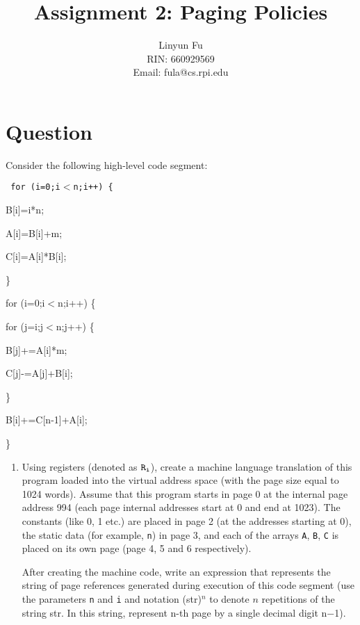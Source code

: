 \documentclass[12pt,letterpaper]{article}
\author{Linyun Fu\\RIN: 660929569\\Email: fula@cs.rpi.edu}
\title{Assignment 2: Paging Policies}
\begin{document}
\maketitle
\part*{Question}
Consider the following high-level code segment:

\vspace{1ex}

{\tt
\hspace{4em}for (i=0;i$<$n;i++) \{

\hspace{8em}B[i]=i*n;

\hspace{8em}A[i]=B[i]+m;

\hspace{8em}C[i]=A[i]*B[i];

\hspace{4em}\}

\hspace{4em}for (i=0;i$<$n;i++) \{

\hspace{8em}for (j=i;j$<$n;j++) \{

\hspace{12em}B[j]+=A[i]*m;

\hspace{12em}C[j]-=A[j]+B[i];

\hspace{8em}\}

\hspace{8em}B[i]+=C[n-1]+A[i];

\hspace{4em}\}
}

\begin{enumerate}
\item Using registers (denoted as $\tt R_i$), create a machine language translation of this
program loaded into the virtual address space (with the page size equal to 1024 words).
Assume that this program starts in page 0 at the internal page address 994 (each page internal
addresses start at 0 and end at 1023). The constants (like 0, 1 etc.) are placed in page 2 (at the
addresses starting at 0), the static data (for example, {\tt n}) in page 3, and each of the arrays {\tt A}, {\tt B}, {\tt C} is placed on its own page (page 4, 5 and 6 respectively).

After creating the machine code, write an expression that represents the string of page
references generated during execution of this code segment (use the parameters {\tt n} and {\tt i} and
notation (str)$^{n}$ to denote $n$ repetitions of the string str. In this string, represent n-th page by
a single decimal digit n$-$1).
\end{enumerate}
\end{document}
